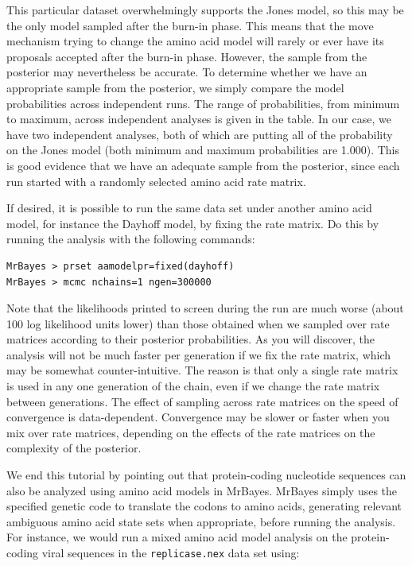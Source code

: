 \documentclass[12pt]{book}
\newcommand{\ttt}[1]{\texttt{#1} }
\begin{document}
This particular dataset overwhelmingly supports the Jones model, so this may be the only model
sampled after the burn-in phase. This means that the move mechanism trying to change the amino acid
model will rarely or ever have its proposals accepted after the burn-in phase. However, the sample
from the posterior may nevertheless be accurate. To determine whether we have an appropriate sample
from the posterior, we simply compare the model probabilities across independent runs. The range of
probabilities, from minimum to maximum, across independent analyses is given in the table. In our
case, we have two independent analyses, both of which are putting all of the probability on the
Jones model (both minimum and maximum probabilities are 1.000). This is good evidence that we have
an adequate sample from the posterior, since each run started with a randomly selected amino acid
rate matrix.

If desired, it is possible to run the same data set under another amino acid model, for instance
the Dayhoff model, by fixing the rate matrix. Do this by running the analysis with the following
commands:

\begin{singlespacing}
\begin{verbatim}
MrBayes > prset aamodelpr=fixed(dayhoff)
MrBayes > mcmc nchains=1 ngen=300000
\end{verbatim}
\end{singlespacing}

Note that the likelihoods printed to screen during the run are much worse (about 100 log likelihood
units lower) than those obtained when we sampled over rate matrices according to their posterior
probabilities.  As you will discover, the analysis will not be much faster per generation if we fix
the rate matrix, which may be somewhat counter-intuitive. The reason is that only a single rate
matrix is used in any one generation of the chain, even if we change the rate matrix between
generations. The effect of sampling across rate matrices on the speed of convergence is
data-dependent. Convergence may be slower or faster when you mix over rate matrices, depending on
the effects of the rate matrices on the complexity of the posterior.

We end this tutorial by pointing out that protein-coding nucleotide sequences can also be analyzed
using amino acid models in MrBayes. MrBayes simply uses the specified genetic code to translate the
codons to amino acids, generating relevant ambiguous amino acid state sets when appropriate, before
running the analysis. For instance, we would run a mixed amino acid model analysis on the
protein-coding viral sequences in the \ttt{replicase.nex} data set using:
\end{document}
